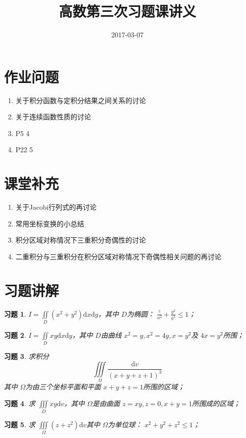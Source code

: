 \documentclass[a4paper, UTF8]{ctexart}
\title{高数第三次习题课讲义}
\date{2017-03-07}
\newtheorem{exercise}{习题}
\begin{document}
\maketitle
\section{作业问题}
\begin{enumerate}
	\item 关于积分函数与定积分结果之间关系的讨论
	\item 关于连续函数性质的讨论
	\item P5 4
	\item P22 5
\end{enumerate}

\section{课堂补充}
\label{sec:课堂补充}
\begin{enumerate}
	\item 关于Jacobi行列式的再讨论
	\item 常用坐标变换的小总结
	\item 积分区域对称情况下三重积分奇偶性的讨论
	\item 二重积分与三重积分在积分区域对称情况下奇偶性相关问题的再讨论
\end{enumerate}

\section{习题讲解}
\label{sec:习题讲解}
\begin{exercise}
	$I = \iint\limits_D \left( x^2 + y^2 \right)\mathrm{d}x \mathrm{d}y$，其中 $D$为椭圆： $\frac{^2}{a^2} + \frac{y^2}{b^2}\le 1$；
\end{exercise}

\begin{exercise}
	$I = \iint\limits_D xy \mathrm{d}x \mathrm{d}y$，其中 $D$由曲线 $x^2=y,x^2=4y,x=y^2$及 $4x=y^2$所围；
\end{exercise}

\begin{exercise}
	求积分
	\begin{equation*}
		\iiint\limits_\Omega \frac{\mathrm{d}v}{\left( x+y+z+1 \right)^3}
	\end{equation*}
	其中 $\Omega$为由三个坐标平面和平面 $x+y+z=1$所围的区域；
\end{exercise}
 \begin{exercise}
 	求 $\iiint\limits_D xy \mathrm{d}v$，其中 $\Omega$是由曲面 $z=xy,z=0,x+y=1$所围成的区域；
 \end{exercise}

 \begin{exercise}
 	求 $\iiint\limits_\Omega \left( z+z^2 \right)\mathrm{d}v$其中 $\Omega$为单位球： $x^2+y^2+z^2\le1$；
 \end{exercise}
\end{document}
